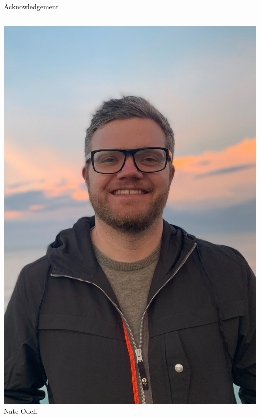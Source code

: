 \begin{frame}{Acknowledgement}
\begin{columns}
        \centering
        \includegraphics[height=0.5\textheight]{slides/figures/nate}\\
        Nate Odell
    \end{columns}
\end{frame}

